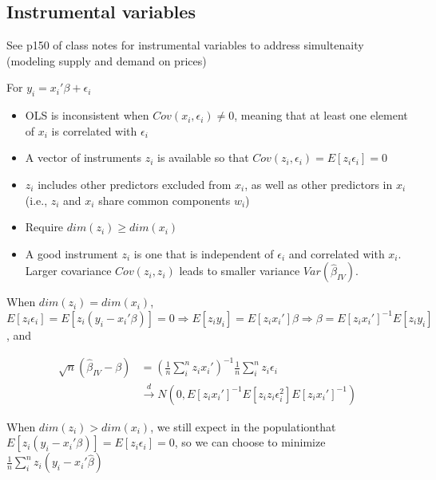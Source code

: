 \documentclass{article}
\begin{document}
\subsection{Instrumental variables}
See p150 of class notes for instrumental variables to address simultenaity (modeling supply and demand on prices)

For $y_i = x_i'\beta + \epsilon_i$

\begin{itemize}
  \item OLS is inconsistent when $Cov(x_i, \epsilon_i) \neq 0$, meaning that at least one element of $x_i$ is correlated with $\epsilon_i$
  \item A vector of instruments $z_i$ is available so that $Cov(z_i, \epsilon_i) = E[z_i\epsilon_i] = 0$
  \item $z_i$ includes other predictors excluded from $x_i$, as well as other predictors in $x_i$ (i.e., $z_i$ and $x_i$ share common components $w_i$)
  \item Require $dim(z_i) \geq dim(x_i)$
  \item A good instrument $z_i$ is one that is independent of $\epsilon_i$ and correlated with $x_i$. Larger covariance $Cov(z_i, z_i)$ leads to smaller variance $Var(\hat{\beta}_{IV})$.
\end{itemize}

When $dim(z_i) = dim(x_i)$, $E[z_i\epsilon_i] = E[z_i(y_i - x_i'\beta)] = 0 \Longrightarrow E[z_iy_i] = E[z_ix_i']\beta \Longrightarrow \beta = E[z_ix_i']^{-1}E[z_iy_i]$, and

\begin{align*}
  \sqrt{n}(\hat{\beta}_{IV} - \beta) & = \left(\frac{1}{n}\sum_i^nz_ix_i'\right)^{-1}\frac{1}{n}\sum_i^nz_i\epsilon_i\\
  &\overset{d}{\longrightarrow} N(0, E[z_ix_i']^{-1} E[z_iz_i\epsilon_i^2] E[z_ix_i']^{-1})
\end{align*}

When $dim(z_i) > dim(x_i)$, we still expect in the populationthat $E[z_i(y_i - x_i'\beta)] = E[z_i\epsilon_i] = 0$, so we can choose to minimize $\frac{1}{n}\sum_i^nz_i(y_i - x_i'\hat{\beta})$
\end{document}
